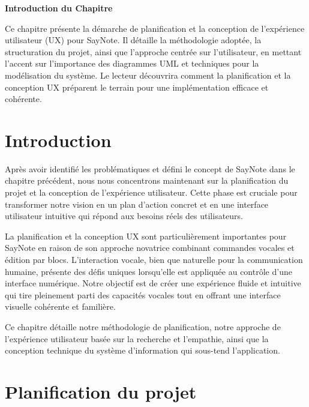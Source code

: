 
\begin{center}
    \textbf{\large Introduction du Chapitre}
    \end{center}
    
        Ce chapitre présente la démarche de planification et la conception de l'expérience utilisateur (UX) pour SayNote. Il détaille la méthodologie adoptée, la structuration du projet, ainsi que l'approche centrée sur l'utilisateur, en mettant l'accent sur l'importance des diagrammes UML et techniques pour la modélisation du système. Le lecteur découvrira comment la planification et la conception UX préparent le terrain pour une implémentation efficace et cohérente.
    
    \section{Introduction}
    
    Après avoir identifié les problématiques et défini le concept de SayNote dans le chapitre précédent, nous nous concentrons maintenant sur la planification du projet et la conception de l'expérience utilisateur. Cette phase est cruciale pour transformer notre vision en un plan d'action concret et en une interface utilisateur intuitive qui répond aux besoins réels des utilisateurs.
    
    La planification et la conception UX sont particulièrement importantes pour SayNote en raison de son approche novatrice combinant commandes vocales et édition par blocs. L'interaction vocale, bien que naturelle pour la communication humaine, présente des défis uniques lorsqu'elle est appliquée au contrôle d'une interface numérique. Notre objectif est de créer une expérience fluide et intuitive qui tire pleinement parti des capacités vocales tout en offrant une interface visuelle cohérente et familière.
    
    Ce chapitre détaille notre méthodologie de planification, notre approche de l'expérience utilisateur basée sur la recherche et l'empathie, ainsi que la conception technique du système d'information qui sous-tend l'application.
    
    \section{Planification du projet}
    
